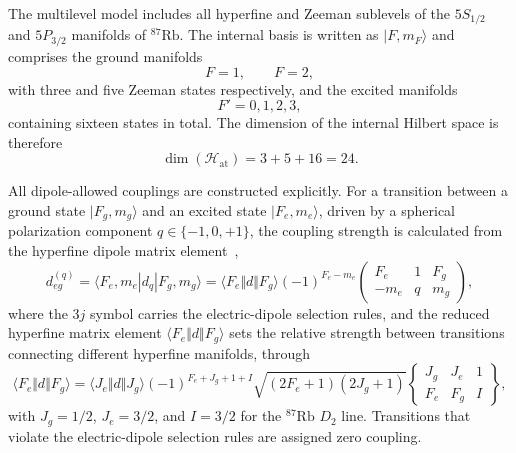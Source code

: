 The multilevel model includes all hyperfine and Zeeman sublevels of the $5S_{1/2}$ and $5P_{3/2}$ manifolds of $^{87}\mathrm{Rb}$. The internal basis is written as $|F,m_F\rangle$ and comprises the ground manifolds
\begin{equation}
    F=1,\qquad F=2,
\end{equation}
with three and five Zeeman states respectively, and the excited manifolds
\begin{equation}
    F'=0,1,2,3,
\end{equation}
containing sixteen states in total. The dimension of the internal Hilbert space is therefore
\begin{equation}
    \dim\!\left(\mathcal H_{\mathrm{at}}\right)=3+5+16=24.
\end{equation}

All dipole-allowed couplings are constructed explicitly. For a transition between a ground state $|F_g,m_g\rangle$ and an excited state $|F_e,m_e\rangle$, driven by a spherical polarization component $q\in\{-1,0,+1\}$, the coupling strength is calculated from the hyperfine dipole matrix element~\cite{SteckRb87},
\begin{equation}
    d_{eg}^{(q)}
    =
    \langle F_e,m_e|d_q|F_g,m_g\rangle
    =
    \langle F_e\Vert d\Vert F_g\rangle
    (-1)^{F_e-m_e}
    \begin{pmatrix}
        F_e & 1 & F_g\\
        -m_e & q & m_g
    \end{pmatrix},
    \label{eq:dipole_matrix_multilevel}
\end{equation}
where the $3j$ symbol carries the electric-dipole selection rules, and the reduced hyperfine matrix element $\langle F_e\Vert d\Vert F_g\rangle$ sets the relative strength between transitions connecting different hyperfine manifolds, through
\begin{equation}
    \langle F_e\Vert d\Vert F_g\rangle
    =
    \langle J_e\Vert d\Vert J_g\rangle
    (-1)^{F_e+J_g+1+I}
    \sqrt{(2F_e+1)(2J_g+1)}
    \begin{Bmatrix}
        J_g & J_e & 1\\
        F_e & F_g & I
    \end{Bmatrix},
    \label{eq:reduced_hyperfine_element}
\end{equation}
with $J_g=1/2$, $J_e=3/2$, and $I=3/2$ for the $^{87}\mathrm{Rb}$ $D_2$ line. Transitions that violate the electric-dipole selection rules are assigned zero coupling.

